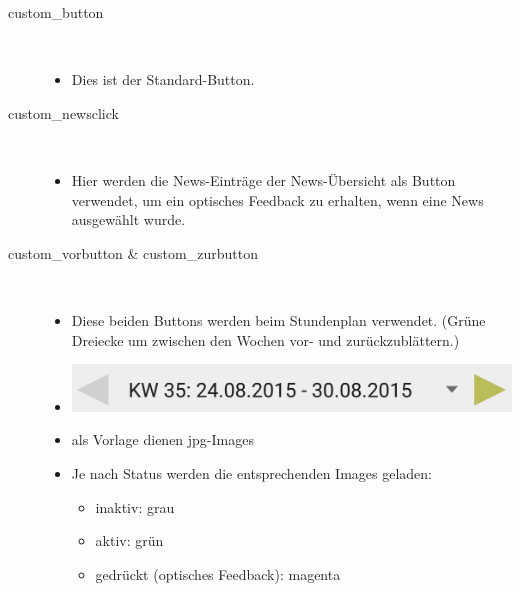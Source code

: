 \begin{description}
\item[custom\_button]~\par
\begin{itemize}
\item Dies ist der Standard-Button.
\end{itemize}
\item[custom\_newsclick]~\par
\begin{itemize}
\item Hier werden die News-Einträge der News-Übersicht als Button verwendet, um ein optisches Feedback zu erhalten, wenn eine News ausgewählt wurde.
\end{itemize}
\item[custom\_vorbutton \& custom\_zurbutton]~\par
\begin{itemize}
\item Diese beiden Buttons werden beim Stundenplan verwendet. (Grüne Dreiecke um zwischen den Wochen vor- und zurückzublättern.)
\item[] \includegraphics[scale=0.5]{05_Handbuch/img/Stundenplan.jpg}
\item als Vorlage dienen jpg-Images
\item Je nach Status werden die entsprechenden Images geladen:
\begin{itemize}
\item inaktiv:  \textcolor{grau01t}{grau}
\item aktiv: \textcolor{gruent}{gr\"un}
\item gedrückt (optisches Feedback): \textcolor{magentat}{magenta}
\end{itemize}
\end{itemize}
\newpage

\end{description}
